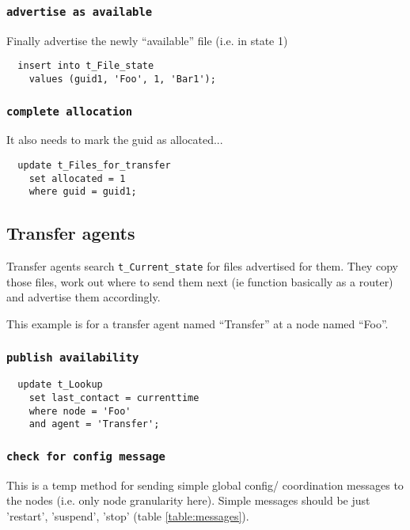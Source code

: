 \documentclass{cmspaper}
\begin{document}
\subsubsection{\textbf{\texttt{advertise as available}}}
Finally advertise the newly ``available'' file (i.e. in state 1)

{\small\begin{verbatim}
  insert into t_File_state
    values (guid1, 'Foo', 1, 'Bar1');
\end{verbatim}}

\subsubsection{\textbf{\texttt{complete allocation}}}
It also needs to mark the guid as allocated...

{\small\begin{verbatim}
  update t_Files_for_transfer 
    set allocated = 1
    where guid = guid1;
\end{verbatim}}


\subsection{Transfer agents}

Transfer agents search \texttt{t\_Current\_state} for files advertised for them.  They copy those files, work out where to send them next (ie function basically as a router) and advertise them accordingly. 

This example is for a transfer agent named ``Transfer'' at a node named ``Foo''.

\subsubsection{\textbf{\texttt{publish availability}}}

{\small\begin{verbatim}
  update t_Lookup
    set last_contact = currenttime
    where node = 'Foo'
    and agent = 'Transfer';
\end{verbatim}}

\subsubsection{\textbf{\texttt{check for config message}}}
This is a temp method for sending simple global config/ coordination messages to the nodes (i.e. only node granularity here). Simple messages should be just 'restart', 'suspend', 'stop' (table \ref{table:messages}).
\end{document}
